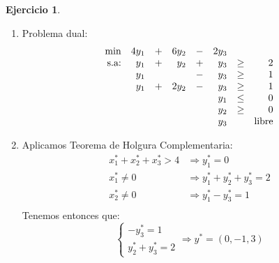 \documentclass[a4paper,oneside,12pt]{amsart}
\newcommand{\xopt}{x^{*}}
\newcommand{\yopt}{y^{*}}
\theoremstyle{definition}
\newtheorem{quest}{Ejercicio}
\begin{document}
\begin{quest}
\begin{enumerate}[label=\alph*)]
                  \vspace{1cm}
                  Valor óptimo de las variables básicas:
                  \[
                      \begin{array}{l}
                          x_1  = 6 \\
                          x_2  = 8 \\
                          w_1  = 10 \\
                      \end{array}
                  \]
                  Valor óptimo de la función objetivo: $20$
                  \item  Problema dual:
                  \[
                        \begin{array}{rrcrcrcr}
                            \min & 4y_1 & + & 6y_2 & - & 2y_3 & & \\
                            \text{s.a:} & y_1 & + & y_2 & + & y_3 & \geq & 2\\
                            & y_1 &  &  & - & y_3 & \geq & 1\\
                            & y_1 & + & 2y_2 & - & y_3 & \geq & 1\\
                            & \multicolumn{5}{r}{y_1} & \leq & 0 \\
                            & \multicolumn{5}{r}{y_2} & \geq & 0 \\
                            & \multicolumn{5}{r}{y_3} &  & \text{libre} \\
                        \end{array}
                        \]
                  \item Aplicamos Teorema de Holgura Complementaria:
                    \[
                  \begin{array}{rl}
                      x_1^\ast + x_2^\ast + \xopt_3 > 4 & \Rightarrow y_1^\ast = 0 \\
                      x_1^\ast \neq 0 & \Rightarrow \yopt_1+\yopt_2+\yopt_3 = 2 \\
                      \xopt_2 \neq 0 & \Rightarrow \yopt_1 - \yopt_3 = 1 \\
                  \end{array}
                  \]
                  Tenemos entonces que:
                  \[
                      \begin{cases}
                          -\yopt_3 = 1 \\
                          \yopt_2 + \yopt_3 = 2
                      \end{cases}
                      \Rightarrow \yopt = (0,-1, 3)
                  \]
        \end{enumerate}
    \end{quest}
\end{document}
